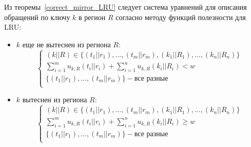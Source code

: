 \documentclass[14pt]{extreport}
\newcommand{\LRU}{\textsf{LRU}\xspace}
\begin{document}
Из теоремы~\ref{correct_mirror_LRU} следует система уравнений для
описания обращений по ключу $k$ в регион $R$ согласно методу функций полезности для \LRU: \begin{itemize}
\item $k$ еще не вытеснен из региона $R$:
$$
\left\{\begin{array}{l} (k||R) \in \{(t_1||r_1), ..., (t_m||r_m), (k_1||R_1), ..., (k_n||R_n)\}\\
\sum\limits_{i=1}^m u_{k,R}(t_i||r_i) + \sum\limits_{i=1}^n u_{k,R}(k_i||R_i) < w\\
\{(t_1||r_1), ..., (t_m||r_m)\} - \mbox{все разные}\\
\end{array} \right.
$$
\item $k$ вытеснен из региона $R$:
$$
\left\{\begin{array}{l} (k||R) \in \{(t_1||r_1), ..., (t_m||r_m), (k_1||R_1), ..., (k_n||R_n)\}\\
\sum\limits_{i=1}^m u_{k,R}(t_i||r_i) + \sum\limits_{i=1}^n u_{k,R}(k_i||R_i)
\geqslant w\\
\{(t_1||r_1), ..., (t_m||r_m)\} - \mbox{все разные}\\
\end{array} \right.
$$
\end{itemize}


%
%
%
%
\end{document}
